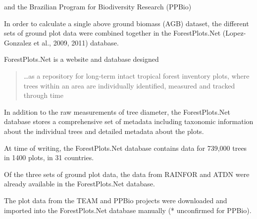\documentclass{article}
\begin{document}
and the
Brazilian Program for Biodiversity Research (PPBio)


In order to calculate a single above ground biomass (AGB) dataset,
the different sets of ground plot data were
combined together in the
ForestPlots.Net (Lopez-Gonzalez et al., 2009, 2011)
database.

ForestPlots.Net is a website and database designed 
\begin{quote}
\ldots as a repository for long-term intact tropical forest inventory
plots, where trees within an area are individually identified,
measured and tracked through time
\end{quote}

In addition to the raw measurements of tree diameter, the ForestPlots.Net database
stores a comprehensive set of metadata including taxonomic information about
the individual trees and detailed metadata about the plots.

At time of writing, the ForestPlots.Net
database contains data for 739,000 trees
in 1400 plots, in 31 countries.

Of the three sets of ground plot data, 
the data from RAINFOR and ATDN
were already available in the
ForestPlots.Net
database.

The plot data from the TEAM and PPBio projects were downloaded
and imported into the ForestPlots.Net database
manually (* unconfirmed for PPBio).
\end{document}
